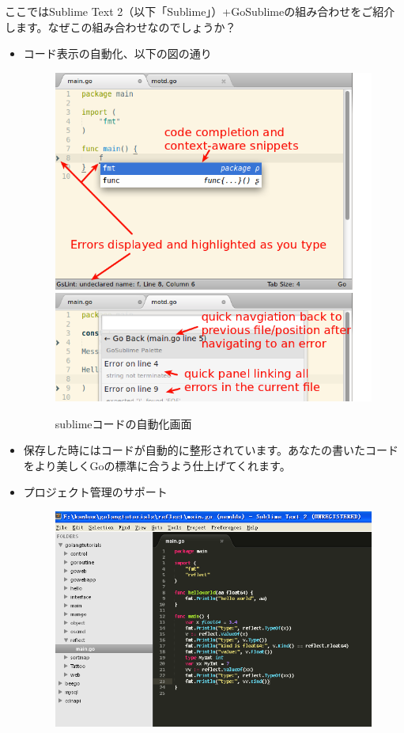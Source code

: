 ここではSublime Text 2（以下「Sublime」）+GoSublimeの組み合わせをご紹介します。なぜこの組み合わせなのでしょうか？


\begin{itemize}
  \item コード表示の自動化、以下の図の通り\\ 
\begin{figure}[H]
  \includegraphics[width=14cm]{1.4.sublime1.png}
   \label{図1.5}
   \caption{sublimeコードの自動化画面}
\end{figure}
  \item 保存した時にはコードが自動的に整形されています。あなたの書いたコードをより美しくGoの標準に合うよう仕上げてくれます。
  \item プロジェクト管理のサポート\\ 
\begin{figure}[H]
  \includegraphics[width=14cm]{1.4.sublime2.png}

\end{figure}
\end{itemize}
